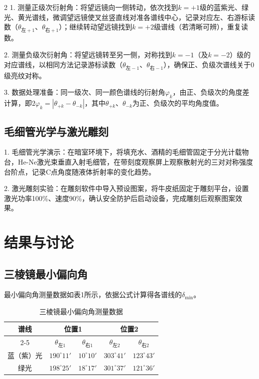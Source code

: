 \documentclass[12pt,a4paper]{article}
\begin{document}
\begin{multicols}{2}
    1. 测量正级次衍射角：将望远镜向一侧转动，依次找到$k=+1$级的蓝紫光、绿光、黄光谱线，微调望远镜使叉丝竖直线对准各谱线中心，记录对应左、右游标读数（$\theta_{\text{左}+1}$、$\theta_{\text{右}+1}$）；继续转动望远镜找到$k=+2$级谱线（若清晰可辨），重复读数。

    2. 测量负级次衍射角：将望远镜转至另一侧，对称找到$k=-1$（及$k=-2$）级的对应谱线，以相同方法记录游标读数（$\theta_{\text{左}-1}$、$\theta_{\text{右}-1}$），确保正、负级次谱线关于0级亮纹对称。

    3. 数据处理准备：同一级次、同一颜色谱线的衍射角$\varphi_k$，由正、负级次的角度差计算，即$2\varphi_k = |\theta_{+k} - \theta_{-k}|$，其中$\theta_{+k}$、$\theta_{-k}$为正、负级次的平均角度值。



    \subsection{\heiti 毛细管光学与激光雕刻}

    \songti

    1. 毛细管光学演示：在暗室环境下，将填充水、酒精的毛细管固定于分光计载物台，He-Ne激光束垂直入射毛细管，在带刻度观察屏上观察散射光的三对对称强度台阶点，记录C点角度随液体折射率的变化趋势。

    2. 激光雕刻实验：在雕刻软件中导入预设图案，将牛皮纸固定于雕刻平台，设置激光功率100\%、速度90\%，确认安全防护后启动设备，完成雕刻后观察图案效果。



    \section{\heiti 结果与讨论}

    \subsection{\heiti 三棱镜最小偏向角}

    \songti

最小偏向角测量数据如表1所示，依据公式计算得各谱线的$\delta_{\text{min}}$。

    \begin{table}[htbp]
    \centering
    \caption{三棱镜最小偏向角测量数据}
    \songti
    \begin{tabular}{c|cc|cc}
    \toprule
    谱线 & \multicolumn{2}{c|}{位置1} & \multicolumn{2}{c}{位置2} \\
    \cline{2-5}
    & $\theta_{\text{左}1}$ & $\theta_{\text{右}1}$ & $\theta_{\text{左}2}$ & $\theta_{\text{右}2}$ \\
    \midrule
    蓝（紫）光 & $190^\circ11'$ & $10^\circ10'$ & $303^\circ41'$ & $123^\circ43'$ \\
    绿光 & $198^\circ25'$ & $18^\circ17'$ & $301^\circ37'$ & $121^\circ36'$ \\
    \bottomrule
    \end{tabular}
    \label{tab:prism_data}
    \end{table}


\end{multicols}
\end{document}
